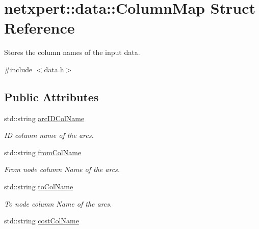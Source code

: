 \hypertarget{structnetxpert_1_1data_1_1ColumnMap}{}\section{netxpert\+:\+:data\+:\+:Column\+Map Struct Reference}
\label{structnetxpert_1_1data_1_1ColumnMap}


Stores the column names of the input data.  




{\ttfamily \#include $<$data.\+h$>$}

\subsection*{Public Attributes}
\begin{DoxyCompactItemize}
\item 
std\+::string \hyperlink{structnetxpert_1_1data_1_1ColumnMap_afa2e07c5ca6f7bca12dd69aa0f6afb3d}{arc\+I\+D\+Col\+Name}\hypertarget{structnetxpert_1_1data_1_1ColumnMap_afa2e07c5ca6f7bca12dd69aa0f6afb3d}{}\label{structnetxpert_1_1data_1_1ColumnMap_afa2e07c5ca6f7bca12dd69aa0f6afb3d}

\begin{DoxyCompactList}\small\item\em ID column name of the arcs. \end{DoxyCompactList}\item 
std\+::string \hyperlink{structnetxpert_1_1data_1_1ColumnMap_a006100a7e43d78db1fe67277bd2a7363}{from\+Col\+Name}\hypertarget{structnetxpert_1_1data_1_1ColumnMap_a006100a7e43d78db1fe67277bd2a7363}{}\label{structnetxpert_1_1data_1_1ColumnMap_a006100a7e43d78db1fe67277bd2a7363}

\begin{DoxyCompactList}\small\item\em From node column Name of the arcs. \end{DoxyCompactList}\item 
std\+::string \hyperlink{structnetxpert_1_1data_1_1ColumnMap_aae1750eea68bc1f4a7da4d61a6ef9849}{to\+Col\+Name}\hypertarget{structnetxpert_1_1data_1_1ColumnMap_aae1750eea68bc1f4a7da4d61a6ef9849}{}\label{structnetxpert_1_1data_1_1ColumnMap_aae1750eea68bc1f4a7da4d61a6ef9849}

\begin{DoxyCompactList}\small\item\em To node column Name of the arcs. \end{DoxyCompactList}\item 
std\+::string \hyperlink{structnetxpert_1_1data_1_1ColumnMap_a33a2ae88decf47649144469e5209a1c6}{cost\+Col\+Name}\hypertarget{structnetxpert_1_1data_1_1ColumnMap_a33a2ae88decf47649144469e5209a1c6}{}\label{structnetxpert_1_1data_1_1ColumnMap_a33a2ae88decf47649144469e5209a1c6}


\end{DoxyCompactItemize}
